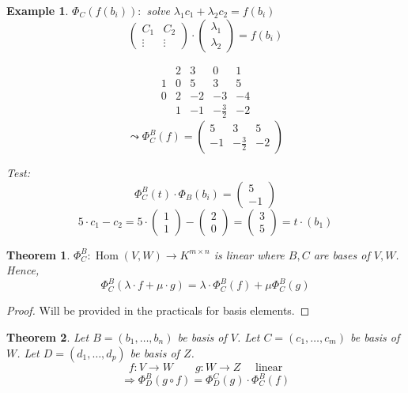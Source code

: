 \documentclass[a4paper,landscape,twocolumn]{article}
\newtheorem{theorem}{Theorem}
\newtheorem{ex}{Example}
\DeclareMathOperator\Hom{Hom} %
\begin{document}
\begin{ex}
  $\Phi_C(f(b_i)):$ solve $\lambda_1 c_1 + \lambda_2 c_2 = f(b_i)$
  \[
    \begin{pmatrix} C_1 & C_2 \\ \vdots & \vdots \end{pmatrix}
    \cdot
    \begin{pmatrix} \lambda_1 \\ \lambda_2 \end{pmatrix} = f(b_i)
  \]

  \[
    \begin{array}{cc|ccc}
        & 2 & 3 & 0 & 1 \\
      1 & 0 & 5 & 3 & 5 \\
    \hline
      0 & 2 & -2 & -3 & -4 \\
        & 1 & -1 & -\frac32 & -2
    \end{array}
  \] \[
    \leadsto
    \Phi_C^B(f) = \begin{pmatrix}
      5 & 3 & 5 \\
      -1 & -\frac32 & -2
    \end{pmatrix}
  \]


  Test:
  \[ \Phi_C^B(t) \cdot \Phi_B(b_i) = \begin{pmatrix} 5 \\ -1 \end{pmatrix} \]
  \[
    5 \cdot c_1 - c_2 = 5 \cdot \begin{pmatrix} 1 \\ 1 \end{pmatrix} - \begin{pmatrix} 2 \\ 0 \end{pmatrix}
    = \begin{pmatrix} 3 \\ 5 \end{pmatrix} = t \cdot (b_1)
  \]
\end{ex}

\begin{theorem}
  \label{satz-6.54}
  $\Phi_C^B: \Hom(V,W) \to K^{m\times n}$ is linear where $B,C$ are bases of $V, W$.
  Hence,
  \[ \Phi_C^B(\lambda \cdot f + \mu \cdot g) = \lambda \cdot \Phi_C^B(f) + \mu \Phi_C^B(g) \]
\end{theorem}
\begin{proof}
  Will be provided in the practicals for basis elements.
\end{proof}

\begin{theorem}
  \label{satz-6.56}
  Let $B = (b_1, \ldots, b_n)$ be basis of $V$.
  Let $C = (c_1, \ldots, c_m)$ be basis of $W$.
  Let $D = (d_1, \ldots, d_p)$ be basis of $Z$.
  \[ f: V \to W \qquad g: W \to Z \quad \text{ linear} \]
  \[ \Rightarrow \Phi_D^B (g \circ f) = \Phi_D^C(g) \cdot \Phi_C^B(f) \]
\end{theorem}
\end{document}
